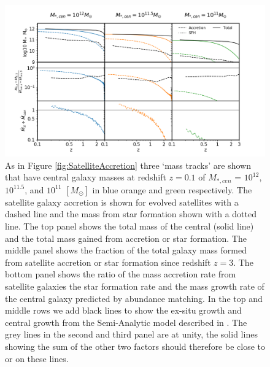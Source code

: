 \begin{figure}
	\centering
	\includegraphics[width = \linewidth]{Appendices/StellarMassAssembly/SatelliteAccretion_Menci.png}
    \caption{As in Figure \ref{fig:SatelliteAccretion} three `mass tracks' are shown that have central galaxy masses at redshift $z = 0.1$ of $M_{*,cen}$ = $10^{12}$, $10^{11.5}$, and $10^{11}$ $[M_{\odot}]$ in blue orange and green respectively. The satellite galaxy accretion is shown for evolved satellites with a dashed line and the mass from star formation shown with a dotted line. The top panel shows the total mass of the central (solid line) and the total mass gained from accretion or star formation. The middle panel shows the fraction of the total galaxy mass formed from satellite accretion or star formation since redshift $z=3$. The bottom panel shows the ratio of the mass accretion rate from satellite galaxies the star formation rate and the mass growth rate of the central galaxy predicted by abundance matching. In the top and middle rows we add black lines to show the ex-situ growth and central growth from the Semi-Analytic model described in \citet{Menci2014TriggeringInteractions}. The grey lines in the second and third panel are at unity, the solid lines showing the sum of the other two factors should therefore be close to or on these lines.}
	\label{fig:SatelliteAccretion_Menci}
\end{figure}